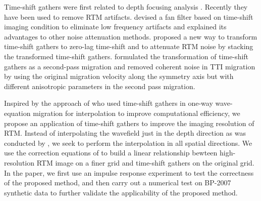 Time-shift gathers were first related to depth focusing analysis \cite[]{faye86,mackay92,nemeth96}.
Recently they have been used to remove RTM artifacts. 
\cite{kaelin11} devised a fan filter based on time-shift imaging condition to eliminate low frequency artifacts and explained its advantages to
other noise attenuation methods.
\cite{khalil13} proposed a new way to transform time-shift gathers to zero-lag time-shift and
to attenuate RTM noise by stacking the transformed time-shift gathers.
\cite{xu14} formulated the transformation of time-shift gathers as a second-pass migration
and removed coherent noise in TTI migration by using the original migration velocity along the symmetry axis but with different
anisotropic parameters in the second pass migration.

Inspired by the approach of \cite{ng07} who used time-shift gathers in one-way wave-equation migration for interpolation to improve computational efficiency,
we propose an application of time-shift gathers to improve the imaging resolution of RTM.
Instead of interpolating the wavefield just in the depth direction as was conducted by \cite{ng07}, 
we seek to perform the interpolation in all spatial directions.
We use the correction equations of \cite{xu14} to build a linear relationship bewteen high-resolution RTM image on a finer grid 
and time-shift gathers on the original grid.
In the paper, we first use an impulse response experiment to test the correctness of the proposed method, 
and then carry out a numerical test on BP-2007 synthetic data to further validate the applicability of the proposed method.

